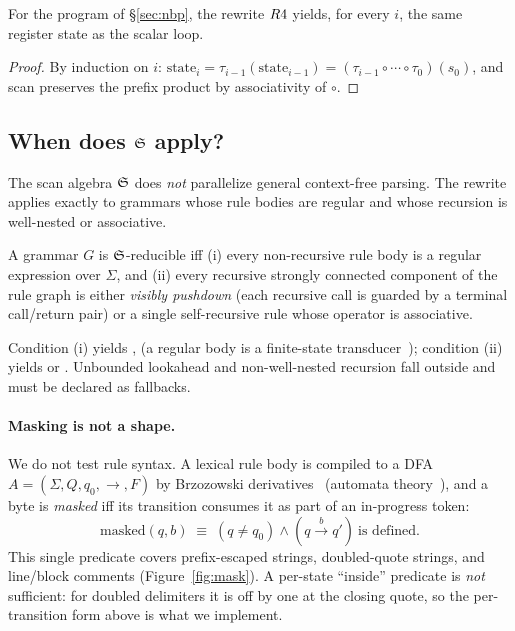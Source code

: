\begin{proposition}[Scan]
For the program of \S\ref{sec:nbp}, the rewrite $R4$ yields, for every $i$,
the same register state as the scalar loop.
\end{proposition}
\begin{proof}
By induction on $i$: $\text{state}_i = \tau_{i-1}(\text{state}_{i-1}) =
(\tau_{i-1}\circ\cdots\circ\tau_0)(s_0)$, and scan preserves the prefix product
by associativity of $\circ$.
\end{proof}

\subsection{When does $\SA$ apply?}
\label{sec:when}

The scan algebra $\SA$ does \emph{not} parallelize general context-free parsing.  The rewrite
applies exactly to grammars whose rule bodies are regular and whose recursion is
well-nested or associative.

\begin{definition}[$\SA$-reducible]
A grammar $G$ is $\SA$-reducible iff (i) every non-recursive rule body is a
regular expression over $\Sigma$, and (ii) every recursive strongly connected
component of the rule graph is either \emph{visibly pushdown} (each recursive
call is guarded by a terminal call/return pair) or a single self-recursive rule
whose operator is associative.
\end{definition}

Condition (i) yields \Rfour, \Rfive{} (a regular body is a finite-state
transducer~\cite{eilenberg,mealy}); condition (ii) yields \Rsix{} or \Rseven.  Unbounded lookahead and
non-well-nested recursion fall outside and must be declared as fallbacks.

\paragraph{Masking is not a shape.}
We do not test rule syntax.  A lexical rule body is compiled to a DFA
$A=(\Sigma,Q,q_0,\to,F)$ by Brzozowski derivatives~\cite{brzozowski}
(automata theory~\cite{eilenberg,hopcroftullman}), and a byte is \emph{masked}
iff its transition consumes it as part of an in-progress token:
\[
  \mathrm{masked}(q,b) \;\equiv\; (q\ne q_0)\wedge (q\xrightarrow{b} q')
  \ \text{is defined}.
\]
This single predicate covers prefix-escaped strings, doubled-quote strings, and
line/block comments (Figure~\ref{fig:mask}).  A per-state ``inside'' predicate
is \emph{not} sufficient: for doubled delimiters it is off by one at the closing
quote, so the per-transition form above is what we implement.

